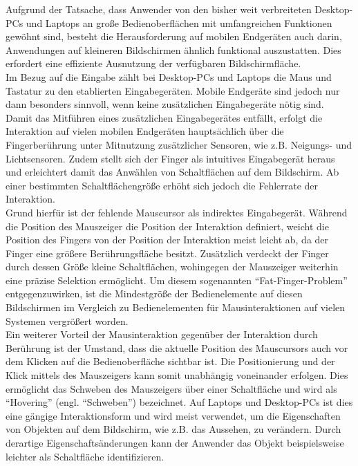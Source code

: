 \documentclass[a4paper,12pt,bibliography=totoc]{scrreprt}%
\begin{document}
Aufgrund der Tatsache, dass Anwender von den bisher weit verbreiteten Desktop-PCs und Laptops an große Bedienoberflächen mit umfangreichen Funktionen gewöhnt sind, besteht die Herausforderung auf mobilen Endgeräten auch darin, Anwendungen auf kleineren Bildschirmen ähnlich funktional auszustatten. Dies erfordert eine effiziente Ausnutzung der verfügbaren Bildschirmfläche.\\
Im Bezug auf die Eingabe zählt bei Desktop-PCs und Laptops die Maus und Tastatur zu den etablierten Eingabegeräten.  Mobile Endgeräte sind jedoch nur dann besonders sinnvoll, wenn keine zusätzlichen Eingabegeräte nötig sind. Damit das Mitführen eines zusätzlichen Eingabegerätes entfällt, erfolgt die Interaktion auf vielen mobilen Endgeräten hauptsächlich über die Fingerberührung unter Mitnutzung zusätzlicher Sensoren, wie z.B. Neigungs- und Lichtsensoren. Zudem stellt sich der Finger als intuitives Eingabegerät heraus und erleichtert damit das Anwählen von Schaltflächen auf dem Bildschirm. Ab einer bestimmten Schaltflächengröße erhöht sich jedoch die Fehlerrate der Interaktion.\cite{mousetouchmk}\\
Grund hierfür ist der fehlende Mauscursor als indirektes Eingabegerät. Während die Position des Mauszeiger die Position der Interaktion definiert, weicht die Position des Fingers von der Position der Interaktion meist leicht ab, da der Finger eine größere Berührungsfläche besitzt. Zusätzlich verdeckt der Finger durch dessen Größe kleine Schaltflächen, wohingegen der Mauszeiger weiterhin eine präzise Selektion ermöglicht. Um diesem sogenannten "`Fat-Finger-Problem"'\cite{monkeys} entgegenzuwirken, ist die Mindestgröße der Bedienelemente auf diesen Bildschirmen im Vergleich zu Bedienelementen für Mausinteraktionen auf vielen Systemen vergrößert worden.\cite{jin}\\
Ein weiterer Vorteil der Mausinteraktion gegenüber der Interaktion durch Berührung ist der Umstand, dass die aktuelle Position des Mauscursors auch vor dem Klicken auf die Bedienoberfläche sichtbar ist. Die Positionierung und der Klick mittels des Mauszeigers kann somit unabhängig voneinander erfolgen. Dies ermöglicht das Schweben des Mauszeigers über einer Schaltfläche und wird als "`Hovering"' (engl. "`Schweben"') bezeichnet. Auf Laptops und Desktop-PCs ist dies eine gängige Interaktionsform und wird meist verwendet, um die Eigenschaften von Objekten auf dem Bildschirm, wie z.B. das Aussehen, zu verändern. Durch derartige Eigenschaftsänderungen kann der Anwender das Objekt beispielsweise leichter als Schaltfläche identifizieren.
\end{document}
